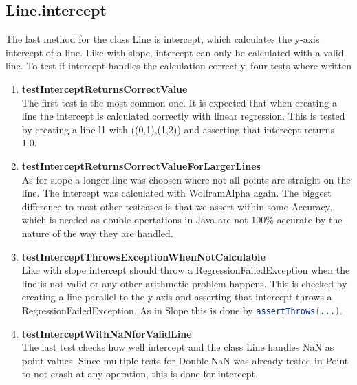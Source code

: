 \subsection{Line.intercept}
The last method for the class Line is intercept, which calculates the y-axis intercept of a line. Like with slope, intercept can only be calculated with a valid line. To test if intercept handles the calculation correctly, four tests where written
\begin{enumerate}
    \item \textbf{testInterceptReturnsCorrectValue} \\
    The first test is the most common one. It is expected that when creating a line the intercept is calculated correctly with linear regression. This is tested by creating a line l1 with ((0,1),(1,2)) and asserting that intercept returns 1.0.
    \item \textbf{testInterceptReturnsCorrectValueForLargerLines} \\
    As for slope a longer line was choosen where not all points are straight on the line. The intercept was calculated with WolframAlpha again. The biggest difference to most other testcases is that we assert within some Accuracy, which is needed as double opertations in Java are not 100\% accurate by the nature of the way they are handled.
    \item \textbf{testInterceptThrowsExceptionWhenNotCalculable} \\
    Like with slope intercept should throw a RegressionFailedException when the line is not valid or any other arithmetic problem happens. This is checked by creating a line parallel to the y-axis and asserting that intercept throws a RegressionFailedException. As in Slope this is done by \lstinline[language=java]{assertThrows(...)}.
    \item \textbf{testInterceptWithNaNforValidLine} \\
    The last test checks how well intercept and the class Line handles NaN as point values. Since multiple tests for Double.NaN was already tested in Point to not crash at any operation, this is done for intercept.
\end{enumerate}